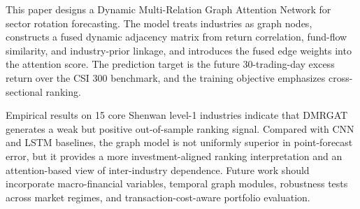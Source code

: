 \documentclass[12pt]{article}
\begin{document}
This paper designs a Dynamic Multi-Relation Graph Attention Network for sector rotation forecasting. The model treats industries as graph nodes, constructs a fused dynamic adjacency matrix from return correlation, fund-flow similarity, and industry-prior linkage, and introduces the fused edge weights into the attention score. The prediction target is the future 30-trading-day excess return over the CSI 300 benchmark, and the training objective emphasizes cross-sectional ranking.

Empirical results on 15 core Shenwan level-1 industries indicate that DMRGAT generates a weak but positive out-of-sample ranking signal. Compared with CNN and LSTM baselines, the graph model is not uniformly superior in point-forecast error, but it provides a more investment-aligned ranking interpretation and an attention-based view of inter-industry dependence. Future work should incorporate macro-financial variables, temporal graph modules, robustness tests across market regimes, and transaction-cost-aware portfolio evaluation.



\end{document}
